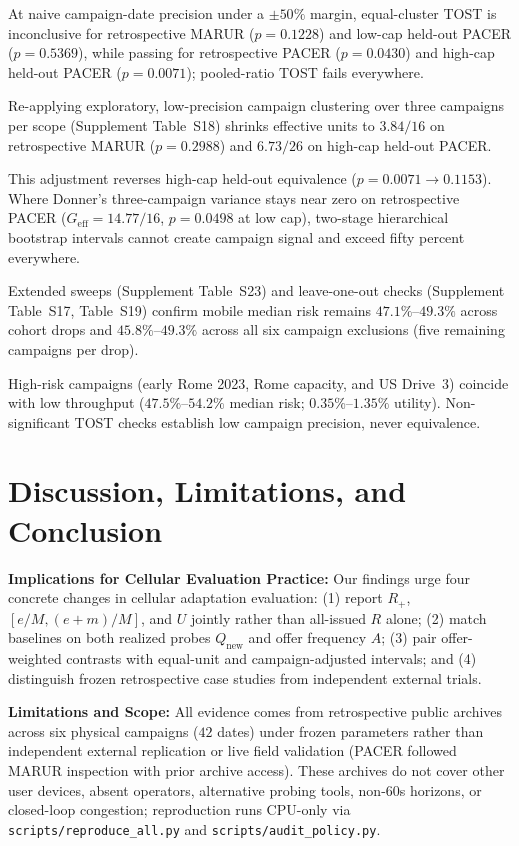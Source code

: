 \documentclass[journal,10pt]{IEEEtran}
\begin{document}
At naive campaign-date precision under a $\pm 50\%$ margin, equal-cluster TOST is inconclusive for retrospective MARUR ($p=0.1228$) and low-cap held-out PACER ($p=0.5369$), while passing for retrospective PACER ($p=0.0430$) and high-cap held-out PACER ($p=0.0071$); pooled-ratio TOST fails everywhere.

Re-applying exploratory, low-precision campaign clustering over three campaigns per scope (Supplement Table~S18) shrinks effective units to $3.84/16$ on retrospective MARUR ($p=0.2988$) and $6.73/26$ on high-cap held-out PACER.

This adjustment reverses high-cap held-out equivalence ($p=0.0071 \to 0.1153$). Where Donner's three-campaign variance stays near zero on retrospective PACER ($G_{\text{eff}}=14.77/16$, $p=0.0498$ at low cap), two-stage hierarchical bootstrap intervals cannot create campaign signal and exceed fifty percent everywhere.

Extended sweeps (Supplement Table~S23) and leave-one-out checks (Supplement Table~S17, Table~S19) confirm mobile median risk remains $47.1\%$--$49.3\%$ across cohort drops and $45.8\%$--$49.3\%$ across all six campaign exclusions (five remaining campaigns per drop).

High-risk campaigns (early Rome 2023, Rome capacity, and US Drive~3) coincide with low throughput ($47.5\%$--$54.2\%$ median risk; $0.35\%$--$1.35\%$ utility). Non-significant TOST checks establish low campaign precision, never equivalence.



\section{Discussion, Limitations, and Conclusion}
\label{sec:conclusion}
\textbf{Implications for Cellular Evaluation Practice:} Our findings urge four concrete changes in cellular adaptation evaluation: (1) report $R_+$, $[e/M,(e+m)/M]$, and $U$ jointly rather than all-issued $R$ alone; (2) match baselines on both realized probes $Q_{\text{new}}$ and offer frequency $A$; (3) pair offer-weighted contrasts with equal-unit and campaign-adjusted intervals; and (4) distinguish frozen retrospective case studies from independent external trials.

\textbf{Limitations and Scope:} All evidence comes from retrospective public archives across six physical campaigns ($42$ dates) under frozen parameters rather than independent external replication or live field validation (PACER followed MARUR inspection with prior archive access). These archives do not cover other user devices, absent operators, alternative probing tools, non-60s horizons, or closed-loop congestion; reproduction runs CPU-only via \texttt{scripts/\allowbreak reproduce\_all.py} and \texttt{scripts/\allowbreak audit\_policy.py}.
\end{document}
